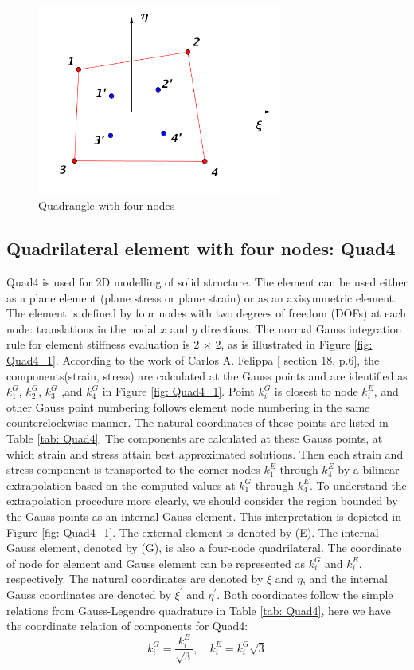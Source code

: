 \begin{figure}[h]
	\begin{center}
		\includegraphics[width=8cm,clip]{DirectCalculation.pdf}			
		\caption{Quadrangle with four nodes}	\label{fig: DirectCalculation}
	\end{center} 
\end{figure}

\subsection{Quadrilateral element with four nodes: Quad4} \label{Quad4}
Quad4 is used for 2D modelling of solid structure. The element can be used either as a plane element (plane stress or plane strain) or as an axisymmetric element. The element is defined by four nodes with two degrees of freedom (DOFs) at each node: translations in the nodal $x$ and $y$ directions. The normal Gauss integration rule for element stiffness evaluation is 2 $\times$ 2, as is illustrated in Figure \ref{fig: Quad4_1}. According to the work of Carlos A. Felippa [\cite{Felippa} section 18, p.6], the components(strain, stress) are calculated at the Gauss points and are identified as $k_1^G$, $k_2^G$, $k_3^G$ ,and $k_4^G$ in Figure \ref{fig: Quad4_1}. Point $k_i^G$ is closest to node $k_i^E$, and other Gauss point numbering follows element node numbering in the same counterclockwise manner. The natural coordinates of these points are listed in Table \ref{tab: Quad4}. The components are calculated at these Gauss points, at which strain and stress attain best approximated solutions. Then each strain and stress component is transported to the corner nodes $k_1^E$ through $k_4^E$ by a bilinear extrapolation based on the computed values at $k_1^G$ through $k_4^E$. To understand the extrapolation procedure more clearly, we should consider the region bounded by the Gauss points as an internal Gauss element. This interpretation is depicted in Figure \ref{fig: Quad4_1}. The external element is denoted by (E). The internal Gauss element, denoted by (G), is also a four-node quadrilateral. The coordinate of node for element and Gauss element can be represented as $k_i^G$ and $k_i^E$, respectively. The natural coordinates are denoted by $\xi$ and $\eta$, and the internal Gauss coordinates are denoted by $\xi^{\prime}$ and $\eta^{\prime}$.  Both coordinates follow the simple relations from Gauss-Legendre quadrature in Table \ref{tab: Quad4}, here we have the coordinate relation of components for Quad4:
\begin{equation}
k_i^G = \frac{k_i^E}{\sqrt{3}},\quad
k_i^E= k_i^G\sqrt{3}
\end{equation}

